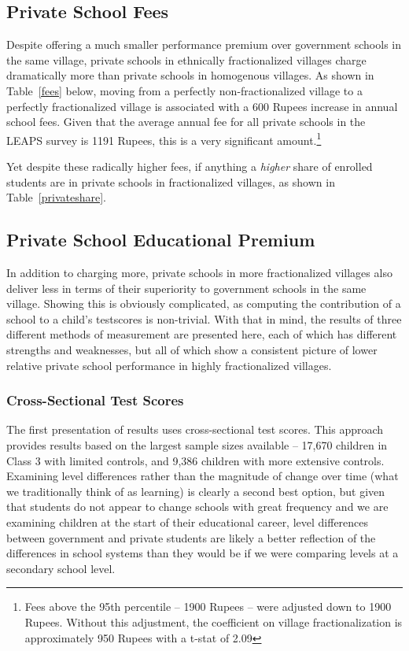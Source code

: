 \documentclass[12pt]{article}
\begin{document}



\subsection{Private School Fees}\label{}

Despite offering a much smaller performance premium over government schools in the same village, private schools in ethnically fractionalized villages charge dramatically more than private schools in homogenous villages. As shown in Table~\ref{fees} below, moving from a perfectly non-fractionalized village to a perfectly fractionalized village is associated with a 600 Rupees increase in annual school fees. Given that the average annual fee for all private schools in the LEAPS survey is 1191 Rupees, this is a very significant amount.\footnote{Fees above the 95th percentile -- 1900 Rupees -- were adjusted down to 1900 Rupees. Without this adjustment, the coefficient on village fractionalization is approximately 950 Rupees with a t-stat of 2.09} 




Yet despite these radically higher fees, if anything a \emph{higher} share of enrolled students are in private schools in fractionalized villages, as shown in Table~\ref{privateshare}. 


\subsection{Private School Educational Premium}\label{}
In addition to charging more, private schools in more fractionalized villages also deliver less in terms of their superiority to government schools in the same village. Showing this is obviously complicated, as computing the contribution of a school to a child's testscores is non-trivial. With that in mind, the results of three different methods of measurement are presented here, each of which has different strengths and weaknesses, but all of which show a consistent picture of lower relative private school performance in highly fractionalized villages. 

\subsubsection{Cross-Sectional Test Scores}\label{} 

The first presentation of results uses cross-sectional test scores. This approach provides results based on the largest sample sizes available -- 17,670 children in Class 3 with limited controls, and 9,386 children with more extensive controls. Examining level differences rather than the magnitude of change over time (what we traditionally think of as learning) is clearly a second best option, but given that students do not appear to change schools with great frequency and we are examining children at the start of their educational career, level differences between government and private students are likely a better reflection of the differences in school systems than they would be if we were comparing levels at a secondary school level.
\end{document}
